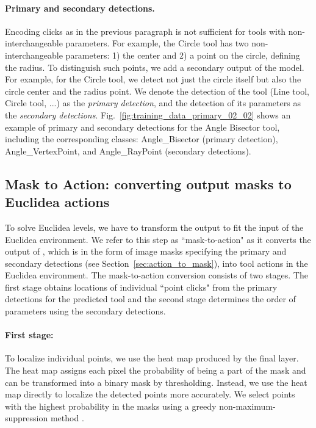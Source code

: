 \paragraph{\textbf{Primary and secondary detections.}}
\label{position_dependent_pars}
Encoding clicks as in the previous paragraph is not sufficient for tools with non-interchangeable parameters.
For example, the Circle tool has two non-interchangeable parameters: 1) the center and 2) a point on the circle, defining the radius.
To distinguish such points, we add a secondary output of the \maskrcnn model.
For example, for the Circle tool, we detect not just the circle itself but also the circle center and the radius point.
We denote the detection of the tool (Line tool, Circle tool, ...) as the \emph{primary detection}, and the detection of its parameters as the \emph{secondary detections}.
Fig.~\ref{fig:training_data_primary_02_02} shows an example of primary and secondary detections for the Angle Bisector tool, including the corresponding classes: Angle\_Bisector (primary detection), Angle\_VertexPoint, and Angle\_RayPoint (secondary detections).
\subsection{Mask to Action: converting output masks to Euclidea actions}
\label{sec:mask_to_action}
To solve Euclidea levels, we have to transform the \maskrcnn output to fit the input of the Euclidea environment.
We refer to this step as ``mask-to-action" as it converts the output of \maskrcnn, which is in the form of image masks specifying the primary and secondary detections (see Section~\ref{sec:action_to_mask}), into tool actions in the Euclidea environment.
The mask-to-action conversion consists of two stages. The first stage obtains locations of individual ``point clicks" from the primary detections for the predicted tool and the second stage determines the order of parameters using the secondary detections.

\paragraph{\textbf{First stage:}} To localize individual points, we use the heat map produced by the final \maskrcnn layer.
The heat map assigns each pixel the probability of being a part of the mask and can be transformed into a binary mask by thresholding.
Instead, we use the heat map directly to localize the detected points more accurately.
We select points with the highest probability in the masks using
a greedy non-maximum-suppression method \cite{non_max_sup}.

